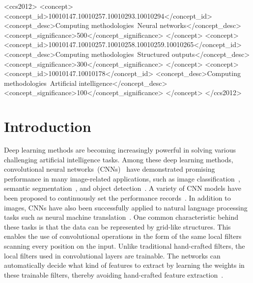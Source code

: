 \documentclass[sigconf]{acmart}
\begin{document}
\begin{CCSXML}
<ccs2012>
<concept>
<concept_id>10010147.10010257.10010293.10010294</concept_id>
<concept_desc>Computing methodologies~Neural networks</concept_desc>
<concept_significance>500</concept_significance>
</concept>
<concept>
<concept_id>10010147.10010257.10010258.10010259.10010265</concept_id>
<concept_desc>Computing methodologies~Structured outputs</concept_desc>
<concept_significance>300</concept_significance>
</concept>
<concept>
<concept_id>10010147.10010178</concept_id>
<concept_desc>Computing methodologies~Artificial intelligence</concept_desc>
<concept_significance>100</concept_significance>
</concept>
</ccs2012>
\end{CCSXML}




\maketitle

\section{Introduction}

Deep learning methods are becoming increasingly powerful in solving
various challenging artificial intelligence tasks. Among these deep
learning methods, convolutional neural
networks~(CNNs)~\cite{lecun1998gradient} have demonstrated promising
performance in many image-related applications, such as image
classification~\cite{imagenet_cvpr09}, semantic
segmentation~\cite{chen2016deeplab}, and object
detection~\cite{ren2015faster,he2017mask}. A variety of CNN models
have been proposed to continuously set the performance
records~\cite{krizhevsky2012imagenet,simonyan2014very,szegedy2015going,he2016deep}.
In addition to images, CNNs have also been successfully applied to
natural language processing tasks such as neural machine
translation~\cite{cho2014properties,luong2015effective,gehring2016convolutional}.
One common characteristic behind these tasks is that the data can be
represented by grid-like structures. This enables the use of
convolutional operations in the form of the same local filters
scanning every position on the input. Unlike traditional
hand-crafted filters, the local filters used in convolutional layers
are trainable. The networks can automatically decide what kind of
features to extract by learning the weights in these trainable
filters, thereby avoiding hand-crafted feature
extraction~\cite{wang2012end}.
\end{document}
